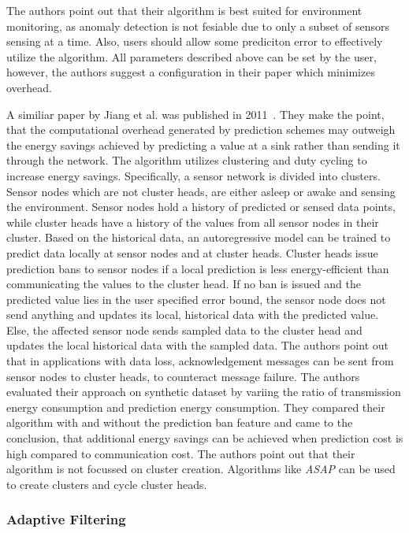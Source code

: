 The authors point out that their algorithm is best suited for environment
monitoring, as anomaly detection is not fesiable due to only a subset of
sensors sensing at a time. Also, users should allow some prediciton error to
effectively utilize the algorithm. All parameters described above can be set by
the user, however, the authors suggest a configuration in their paper which
minimizes overhead.
\par

A similiar paper by Jiang et al. was published in
2011~\cite{jiang2011prediction}. They make the point, that the computational
overhead generated by prediction schemes may outweigh the energy savings
achieved by predicting a value at a sink rather than sending it through the
network. The algorithm utilizes clustering and duty cycling to increase energy
savings. Specifically, a sensor network is divided into clusters. Sensor nodes
which are not cluster heads, are either asleep or awake and sensing the
environment. Sensor nodes hold a history of predicted or sensed data points,
while cluster heads have a history of the values from all sensor nodes in their
cluster. Based on the historical data, an autoregressive model can be trained
to predict data locally at sensor nodes and at cluster heads. Cluster heads
issue prediction bans to sensor nodes if a local prediction is less
energy-efficient than communicating the values to the cluster head. If no ban
is issued and the predicted value lies in the user specified error bound, the
sensor node does not send anything and updates its local, historical data with
the predicted value. Else, the affected sensor node sends sampled data to the
cluster head and updates the local historical data with the sampled data. The
authors point out that in applications with data loss, acknowledgement messages
can be sent from sensor nodes to cluster heads, to counteract message failure.
The authors evaluated their approach on synthetic dataset by variing the ratio
of transmission energy consumption and prediction energy consumption. They
compared their algorithm with and without the prediction ban feature and came
to the conclusion, that additional energy savings can be achieved when
prediction cost is high compared to communication cost. The authors point out
that their algorithm is not focussed on cluster creation. Algorithms like
\textit{ASAP} can be used to create clusters and cycle cluster heads.

\subsubsection{Adaptive Filtering}
\label{sec:Adaptive Filtering}

